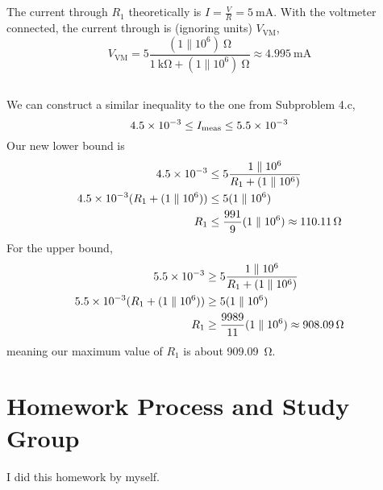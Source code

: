 \documentclass[]{article}
\begin{document}
\subsection{}

The current through \(R_1\) theoretically is \(I = \frac{V}{R} = \SI{5}{\milli\ampere}\). With the voltmeter connected, the current through is (ignoring units) \(V_{\text{VM}}\), 
\begin{equation}
	V_{\text{VM}} = 5\frac{(1 \parallel 10^6) \ \si{\ohm}}{1 \ \si{\kilo\ohm} + (1 \parallel 10^6) \ \si{\ohm}} \approx \SI{4.995}{\milli\ampere}
\end{equation}

\subsection{}

We can construct a similar inequality to the one from Subproblem 4.c, 
\begin{equation}
	\num{4.5d-3} \le I_{\text{meas}} \le \num{5.5d-3}
\end{equation}
Our new lower bound is 
\begin{align}
	\num{4.5d-3} &\le 5\frac{1 \parallel 10^6}{R_1 + (1 \parallel 10^6)} \\
	\num{4.5d-3} (R_1 + (1 \parallel 10^6)) &\le 5 (1 \parallel 10^6) \\
	R_1 &\le \frac{991}{9} (1 \parallel 10^6) \approx \SI{110.11}{\ohm}
\end{align}
For the upper bound, 
\begin{align}
	\num{5.5d-3} &\ge 5\frac{1 \parallel 10^6}{R_1 + (1 \parallel 10^6)} \\
	\num{5.5d-3} (R_1 + (1 \parallel 10^6)) &\ge 5 (1 \parallel 10^6) \\
	R_1 &\ge \frac{9989}{11} (1 \parallel 10^6) \approx \SI{908.09}{\ohm}
\end{align}
meaning our maximum value of \(R_1\) is about \SI{909.09}{\ohm}. 


\section{Homework Process and Study Group}

I did this homework by myself. 

\newpage

%
\end{document}
